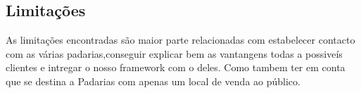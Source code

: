 \subsection{Limitações} 
As limitações encontradas são maior parte relacionadas com estabelecer contacto com as várias padarias,conseguir explicar bem as vantangens todas a possiveís clientes e intregar o nosso framework com o deles. Como tambem ter em conta que se destina a Padarias com apenas um local de venda ao público.